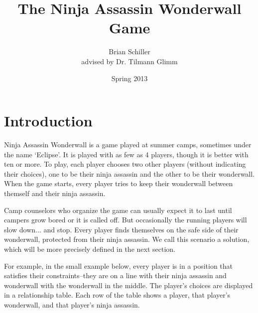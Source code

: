 \documentclass[12pt]{article}
\title{The Ninja Assassin Wonderwall Game}
\author{Brian Schiller \\ { advised by Dr. Tilmann Glimm}}
\date{Spring 2013}
\begin{document}
\maketitle

\tableofcontents

\section{Introduction}
Ninja Assassin Wonderwall is a game played at summer camps, sometimes under the name `Eclipse'. It is played with as few as 4 players, though it is better with ten or more. To play, each player chooses two other players (without indicating their choices), one to be their ninja assassin and the other to be their wonderwall. When the game starts, every player tries to keep their wonderwall between themself and their ninja assassin.

Camp counselors who organize the game can usually expect it to last until campers grow bored or it is called off. But occasionally the running players will slow down... and stop. Every player finds themselves on the safe side of their wonderwall, protected from their ninja assassin. We call this scenario a solution, which will be more precisely defined in the next section.

For example, in the small example below, every player is in a position that satisfies their constraints--they are on a line with their ninja assassin and wonderwall with the wonderwall in the middle. The player's choices are displayed in a relationship table. Each row of the table shows a player, that player's wonderwall, and that player's ninja assassin.
\end{document}
